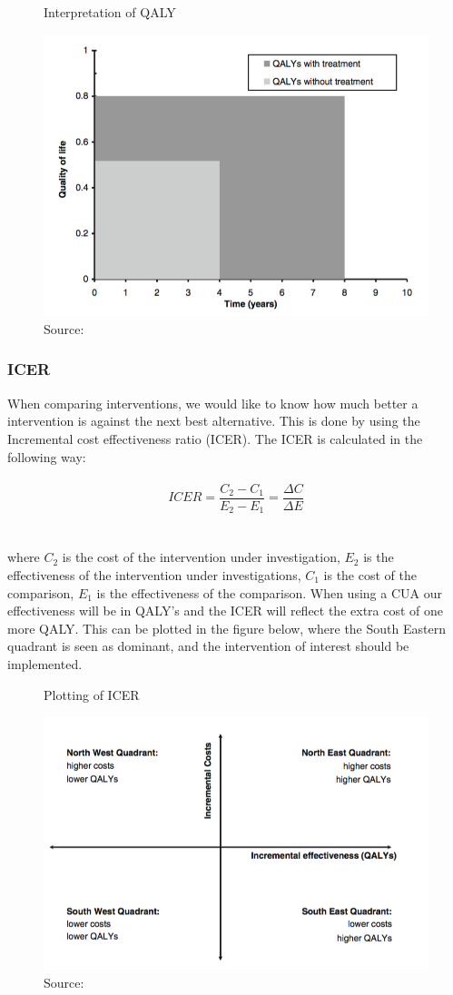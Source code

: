 \documentclass[a4paper,12pt]{article}
\begin{document}
\begin{figure} [h]
	\centering
	\caption{Interpretation of QALY}
	\label{fig:qaly}
	\includegraphics[width=0.7\linewidth]{Pictures/QALY}
	\caption*{Source:  \cite{CUAbog} }
\end{figure}

\subsubsection*{ICER}
When comparing interventions, we would like to know how much better a intervention is against the next best alternative. This is done by using the Incremental cost effectiveness ratio (ICER). The ICER is calculated in the following way: 
\\\\
\begin{equation} ICER=\dfrac{C_2-C_1}{E_2-E_1} =\dfrac{\varDelta C}{\varDelta E}
\end{equation}
\\\\
where $ C_2$ is the cost of the intervention under investigation, $ E_2$ is the effectiveness of the intervention under investigations, $ C_1$ is the cost of the comparison, $ E_1$ is the effectiveness of the comparison. When using a CUA our effectiveness will be in QALY’s and the ICER will reflect the extra cost of one more QALY. This can be plotted in the figure below, where the South Eastern quadrant is seen as dominant, and the intervention of interest should be implemented. 

\begin{figure} [h]
	\centering
	\caption{Plotting of ICER}
	\label{fig:ICER}
	\includegraphics[width=0.7\linewidth]{Pictures/ICER}
	\caption*{Source:  \cite{CUAbog} }
\end{figure}
\end{document}
